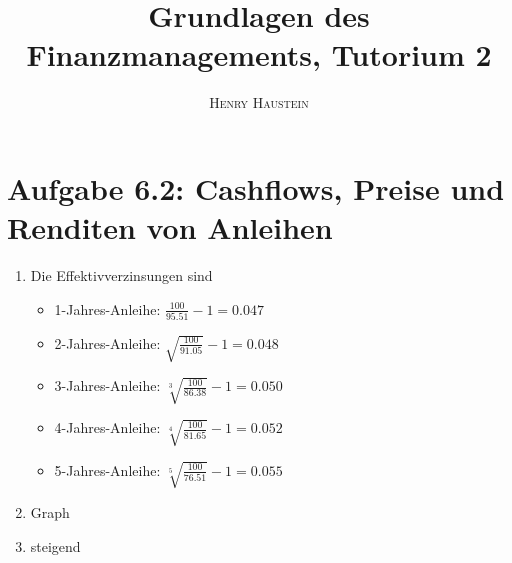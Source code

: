 \documentclass{article}
\title{\textbf{Grundlagen des Finanzmanagements, Tutorium 2}}
\author{\textsc{Henry Haustein}}
\date{}
\begin{document}
	\maketitle
	
	\section*{Aufgabe 6.2: Cashflows, Preise und Renditen von Anleihen}
	\begin{enumerate}[label=(\alph*)]
		\item Die Effektivverzinsungen sind
		\begin{itemize}
			\item 1-Jahres-Anleihe: $\frac{100}{95.51}-1 = 0.047$
			\item 2-Jahres-Anleihe: $\sqrt{\frac{100}{91.05}}-1 = 0.048$
			\item 3-Jahres-Anleihe: $\sqrt[3]{\frac{100}{86.38}}-1 = 0.050$
			\item 4-Jahres-Anleihe: $\sqrt[4]{\frac{100}{81.65}}-1 = 0.052$
			\item 5-Jahres-Anleihe: $\sqrt[5]{\frac{100}{76.51}}-1 = 0.055$
		\end{itemize}
		\item Graph
		\begin{center}
		\end{center}
		\item steigend
	\end{enumerate}
	
\end{document}
